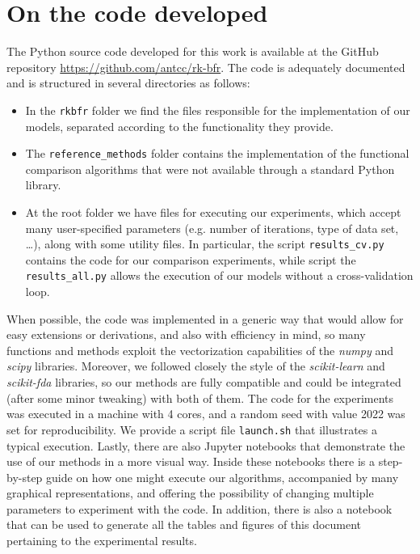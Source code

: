 %
%

\chapter{On the code developed}\label{ch:code}

The Python source code developed for this work is available at the GitHub repository \url{https://github.com/antcc/rk-bfr}. The code is adequately documented and is structured in several directories as follows:

\begin{itemize}
  \item In the \texttt{rkbfr} folder we find the files responsible for the implementation of our models, separated according to the functionality they provide.
  \item The \texttt{reference\_methods} folder contains the implementation of the functional comparison algorithms that were not available through a standard Python library.
  \item At the root folder we have files for executing our experiments, which accept many user-specified parameters (e.g. number of iterations, type of data set, \ldots), along with some utility files. In particular, the script \texttt{results\_cv.py} contains the code for our comparison experiments, while script the \texttt{results\_all.py} allows the execution of our models without a cross-validation loop.
\end{itemize}

When possible, the code was implemented in a generic way that would allow for easy extensions or derivations, and also with efficiency in mind, so many functions and methods exploit the vectorization capabilities of the \textit{numpy} and \textit{scipy} libraries. Moreover, we followed closely the style of the \textit{scikit-learn} and \textit{scikit-fda} libraries, so our methods are fully compatible and could be integrated (after some minor tweaking) with both of them. The code for the experiments was executed in a machine with 4 cores, and a random seed with value 2022 was set for reproducibility. We provide a script file \texttt{launch.sh} that illustrates a typical execution. Lastly, there are also Jupyter notebooks that demonstrate the use of our methods in a more visual way. Inside these notebooks there is a step-by-step guide on how one might execute our algorithms, accompanied by many graphical representations, and offering the possibility of changing multiple parameters to experiment with the code. In addition, there is also a notebook that can be used to generate all the tables and figures of this document pertaining to the experimental results.
